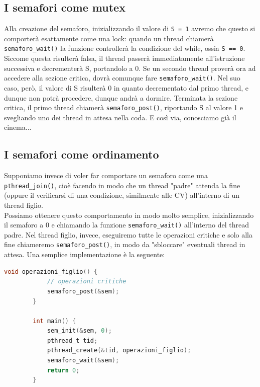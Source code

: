 \documentclass[12pt]{report}
\begin{document}
	\subsection{I semafori come mutex}
	Alla creazione del semaforo, inizializzando il valore di \texttt{S = 1} avremo che questo si comporterà esattamente come una lock: quando un thread chiamerà \texttt{semaforo\_wait()} la funzione controllerà la condizione del while, ossia \texttt{S == 0}. Siccome questa risulterà falsa, il thread passerà immediatamente all'istruzione successiva e decrementerà S, portandolo a 0. Se un secondo thread proverà ora ad accedere alla sezione critica, dovrà comunque fare \texttt{semaforo\_wait()}. Nel suo caso, però, il valore di S risulterà 0 in quanto decrementato dal primo thread, e dunque non potrà procedere, dunque andrà a dormire. Terminata la sezione critica, il primo thread chiamerà \texttt{semaforo\_post()}, riportando S al valore 1 e svegliando uno dei thread in attesa nella coda. E così via, conosciamo già il cinema...
	
	\subsection{I semafori come ordinamento}
	Supponiamo invece di voler far comportare un semaforo come una \texttt{pthread\_join()}, cioè facendo in modo che un thread "padre" attenda la fine (oppure il verificarsi di una condizione, similmente alle CV) all'interno di un thread figlio.\\
	Possiamo ottenere questo comportamento in modo molto semplice, inizializzando il semaforo a 0 e chiamando la funzione \texttt{semaforo\_wait()} all'interno del thread padre. Nel thread figlio, invece, eseguiremo tutte le operazioni critiche e solo alla fine chiameremo \texttt{semaforo\_post()}, in modo da "sbloccare" eventuali thread in attesa. Una semplice implementazione è la seguente:
	\begin{lstlisting}[language=C]
		void operazioni_figlio() {
			// operazioni critiche
			semaforo_post(&sem);
		}
		
		int main() {
			sem_init(&sem, 0);
			pthread_t tid;
			pthread_create(&tid, operazioni_figlio);
			semaforo_wait(&sem);
			return 0;
		}
	\end{lstlisting}
	
\end{document}
